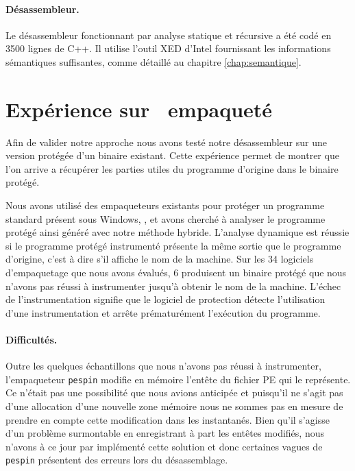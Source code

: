 \paragraph{Désassembleur.}
Le désassembleur fonctionnant par analyse statique et récursive a été codé en 3500 lignes de C++. Il utilise l'outil XED d'Intel \cite{xed} fournissant les informations sémantiques suffisantes, comme détaillé au chapitre \ref{chap:semantique}.

\section{Expérience sur \hostname\ empaqueté}
Afin de valider notre approche nous avons testé notre désassembleur sur une version protégée d'un binaire existant.
Cette expérience permet de montrer que l'on arrive a récupérer les parties utiles du programme d'origine dans le binaire protégé.


Nous avons utilisé des empaqueteurs existants pour protéger un programme standard présent sous Windows, \hostname, et avons cherché à analyser le programme protégé ainsi généré avec notre méthode hybride.
L'analyse dynamique est réussie si le programme protégé instrumenté présente la même sortie que le programme d'origine, c'est à dire s'il affiche le nom de la machine. Sur les 34 logiciels d'empaquetage que nous avons évalués, 6 produisent un binaire protégé que nous n'avons pas réussi à instrumenter jusqu'à obtenir le nom de la machine.
L'échec de l'instrumentation signifie que le logiciel de protection détecte l'utilisation d'une instrumentation et arrête prématurément l'exécution du programme.

\paragraph{Difficultés.}
Outre les quelques échantillons que nous n'avons pas réussi à instrumenter, l'empaqueteur \texttt{pespin} modifie en mémoire l'entête du fichier PE qui le représente. Ce n'était pas une possibilité que nous avions anticipée et puisqu'il ne s'agit pas d'une allocation d'une nouvelle zone mémoire nous ne sommes pas en mesure de prendre en compte cette modification dans les instantanés.
Bien qu'il s'agisse d'un problème surmontable en enregistrant à part les entêtes modifiés, nous n'avons à ce jour par implémenté cette solution et donc certaines vagues de \texttt{pespin} présentent des erreurs lors du désassemblage.

